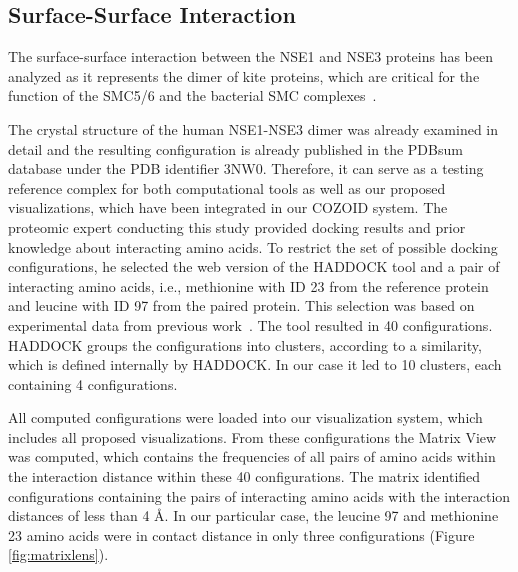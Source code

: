 \documentclass[twocolumn]{bmcart}%
\def\MatView {Matrix View\xspace}
\begin{document}
\subsection{Surface-Surface Interaction}
The surface-surface interaction between the NSE1 and NSE3 proteins has been analyzed as it represents the dimer of kite proteins, which are critical for the function of the SMC5/6 and the bacterial SMC complexes~\cite{Zabrady2016,Palecek2015,Doyle2010}. 

The crystal structure of the human NSE1-NSE3 dimer was already examined in detail and the resulting configuration is already published in the PDBsum database under the PDB identifier 3NW0. 
Therefore, it can serve as a testing reference complex for both computational tools as well as our proposed visualizations, which have been integrated in our COZOID system.
The proteomic expert conducting this study provided docking results and prior knowledge about interacting amino acids.
To restrict the set of possible docking configurations, he selected the web version of the HADDOCK tool and a pair of interacting amino acids, i.e., methionine with ID 23 from the reference protein and leucine with ID 97 from the paired protein.
This selection was based on experimental data from previous work~\cite{Hudson2011,Kozakova,Crabben}.
The tool resulted in 40 configurations.
HADDOCK groups the configurations into clusters, according to a similarity, which is defined internally by HADDOCK.
In our case it led to 10 clusters, each containing 4 configurations.

All computed configurations were loaded into our visualization system, which includes all proposed visualizations.
From these configurations the \MatView was computed, which contains the frequencies of all pairs of amino acids within the interaction distance within these 40 configurations.
The matrix identified configurations containing the pairs of interacting amino acids with the interaction distances of less than 4 \AA.
In our particular case, the leucine 97 and methionine 23 amino acids were in contact distance in only three configurations (Figure \ref{fig:matrixlens}).
\end{document}
